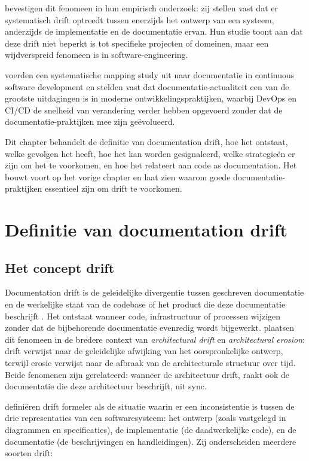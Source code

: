 \textcite{romeo2024didrift} bevestigen dit fenomeen in hun empirisch onderzoek: zij stellen vast dat er systematisch drift optreedt tussen enerzijds het ontwerp van een systeem, anderzijds de implementatie en de documentatie ervan. Hun studie toont aan dat deze drift niet beperkt is tot specifieke projecten of domeinen, maar een wijdverspreid fenomeen is in software-engineering.

\textcite{theunissen2022mappingdocumentation} voerden een systematische mapping study uit naar documentatie in continuous software development en stelden vast dat documentatie-actualiteit een van de grootste uitdagingen is in moderne ontwikkelingspraktijken, waarbij DevOps en CI/CD de snelheid van verandering verder hebben opgevoerd zonder dat de documentatie-praktijken mee zijn geëvolueerd.

Dit chapter behandelt de definitie van documentation drift, hoe het ontstaat, welke gevolgen het heeft, hoe het kan worden gesignaleerd, welke strategieën er zijn om het te voorkomen, en hoe het relateert aan code as documentation. Het bouwt voort op het vorige chapter en laat zien waarom goede documentatie-praktijken essentieel zijn om drift te voorkomen.

\section{Definitie van documentation drift}
\label{sec:drift-definitie}

\subsection{Het concept drift}
Documentation drift is de geleidelijke divergentie tussen geschreven documentatie en de werkelijke staat van de codebase of het product die deze documentatie beschrijft \autocite{whiting2020drifterosion}. Het ontstaat wanneer code, infrastructuur of processen wijzigen zonder dat de bijbehorende documentatie evenredig wordt bijgewerkt. \textcite{whiting2020drifterosion} plaatsen dit fenomeen in de bredere context van \textit{architectural drift} en \textit{architectural erosion}: drift verwijst naar de geleidelijke afwijking van het oorspronkelijke ontwerp, terwijl erosie verwijst naar de afbraak van de architecturale structuur over tijd. Beide fenomenen zijn gerelateerd: wanneer de architectuur drift, raakt ook de documentatie die deze architectuur beschrijft, uit sync.

\textcite{romeo2024didrift} definiëren drift formeler als de situatie waarin er een inconsistentie is tussen de drie representaties van een softwaresysteem: het ontwerp (zoals vastgelegd in diagrammen en specificaties), de implementatie (de daadwerkelijke code), en de documentatie (de beschrijvingen en handleidingen). Zij onderscheiden meerdere soorten drift:

